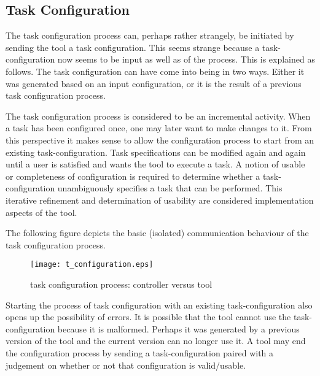 \documentclass{article}
\begin{document}
  \subsection{Task Configuration} \label{ss::tool_configuration}


   The task configuration process can, perhaps rather strangely, be initiated
   by sending the tool a task configuration. This seems strange because a
   task-configuration now seems to be input as well as of the process.  This is
   explained as follows.  The task configuration can have come into being in
   two ways.  Either it was generated based on an input configuration, or it is
   the result of a previous task configuration process.
   
   The task configuration process is considered to be an incremental activity.
   When a task has been configured once, one may later want to make changes to
   it. From this perspective it makes sense to allow the configuration process
   to start from an existing task-configuration. Task specifications can be
   modified again and again until a user is satisfied and wants the tool to
   execute a task. A notion of usable or completeness of configuration is
   required to determine whether a task-configuration unambiguously specifies a
   task that can be performed.  This iterative refinement and determination of
   usability are considered implementation aspects of the tool.

   The following figure depicts the basic (isolated) communication behaviour of
   the task configuration process.
   
   \begin{figure}[H]
    \begin{center}
     \texttt{[image: t\_configuration.eps]}
    \end{center}
    \vspace{-0.3cm}
    \caption{task configuration process: controller versus tool}
   \end{figure}

   \noindent Starting the process of task configuration with an existing
   task-configuration also opens up the possibility of errors. It is possible
   that the tool cannot use the task-configuration because it is malformed.
   Perhaps it was generated by a previous version of the tool and the current
   version can no longer use it. A tool may end the configuration process by
   sending a task-configuration paired with a judgement on whether or not that
   configuration is valid/usable.
\end{document}
